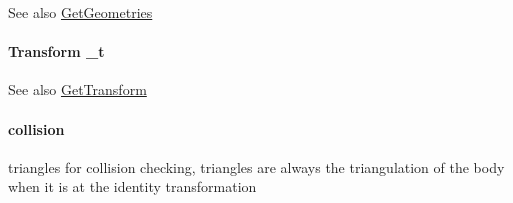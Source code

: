 \label{classOpenRAVE_1_1KinBody_1_1Link_ab6b7d1c39509f8a533583eb6b185418d}
\begin{DoxySeeAlso}{See also}
\hyperlink{classOpenRAVE_1_1KinBody_1_1Link_a3792744cdcfbc87c686624b9e756b2dd}{GetGeometries} 
\end{DoxySeeAlso}
\hypertarget{classOpenRAVE_1_1KinBody_1_1Link_adcfc5692c983a70c6021762566cdc7e0}{
\paragraph[{\_\-t}]{\setlength{\rightskip}{0pt plus 5cm}Transform {\bf \_\-t}}\hfill}
\label{classOpenRAVE_1_1KinBody_1_1Link_adcfc5692c983a70c6021762566cdc7e0}
\begin{DoxySeeAlso}{See also}
\hyperlink{classOpenRAVE_1_1KinBody_1_1Link_a86547f5ece146c65832bab4395226789}{GetTransform} 
\end{DoxySeeAlso}
\hypertarget{classOpenRAVE_1_1KinBody_1_1Link_a6b6b4ec4cfd7d6b0ccaff370fe3ddc5e}{
\paragraph[{collision}]{ {\bf collision}}\hfill}
\label{classOpenRAVE_1_1KinBody_1_1Link_a6b6b4ec4cfd7d6b0ccaff370fe3ddc5e}
triangles for collision checking, triangles are always the triangulation of the body when it is at the identity transformation 